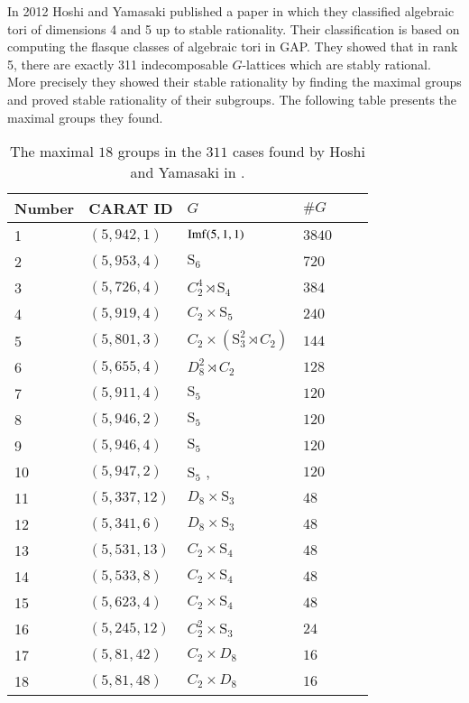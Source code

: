 \documentclass{article}
\theoremstyle{plain}
\theoremstyle{definition}
\begin{document}
In 2012 Hoshi and Yamasaki published a paper \cite{Hoshi} in which they 
classified algebraic tori of dimensions 4 and 5 up to stable rationality. 
Their classification is based on computing the flasque classes of algebraic 
tori in GAP. They showed that in rank 5,  there are exactly 311 indecomposable 
$G$-lattices which are stably rational.  More precisely they showed their 
stable rationality by finding the maximal groups and proved stable rationality 
of their subgroups. The following table presents the maximal groups they found.

\begin{table}[H]
\centering
\begin{tabular}{llllll} 
Number & CARAT ID & $G$ & $\#G$\\ \hline
 1  & $(5,942,1)$ & ${\rm Imf}(5,1,1)$ & $3840$\\
2  & $(5,953,4)$ & $\mathrm{S}_6$ & $720$ \\
3  & $(5,726,4)$ & $C_2^4\rtimes \mathrm{S}_4$ & $384$  \\
4  & $(5,919,4)$ & $C_2\times \mathrm{S}_5$ & $240$ \\
5 & $(5,801,3)$ & $C_2\times (\mathrm{S}_3^2\rtimes C_2)$ & $144$ \\
6 & $(5,655,4)$ & $D_8^2\rtimes C_2$ & $128$ \\
7  & $(5,911,4)$ & $\mathrm{S}_5$ & $120$ \\
8 & $(5,946,2)$ & $\mathrm{S}_5$ & $120$ \\
9 & $(5,946,4)$ & $\mathrm{S}_5$ & $120$ \\
10 & $(5,947,2)$ & $\mathrm{S}_5$ ,\,\,\,\,\,\,\,\,\,\,\,\,\,\,\,\,\,\,\,\,\,\,\,\,\,\,\,\,\,\ & $120$ \\
11 & $(5,337,12)$ & $D_8\times \mathrm{S}_3$ & $48$ \\
12  & $(5,341,6)$ & $D_8\times \mathrm{S}_3$ & $48$ \\
13  & $(5,531,13)$ & $C_2\times \mathrm{S}_4$ & $48$ \\
14  & $(5,533,8)$ & $C_2\times \mathrm{S}_4$ & $48$ \\
15 & $(5,623,4)$ & $C_2\times \mathrm{S}_4$ & $48$\\
16   & $(5,245,12)$ & $C_2^2\times \mathrm{S}_3$ & $24$\\
17  & $(5,81,42)$ & $C_2\times D_8$ & $16$ \\
18  & $(5,81,48)$ & $C_2\times D_8$ & $16$ \\
\end{tabular}
\caption{The maximal $18$ groups 
in the  $311$ cases found by Hoshi and Yamasaki in \cite{Hoshi}.}
\end{table}
\end{document}
